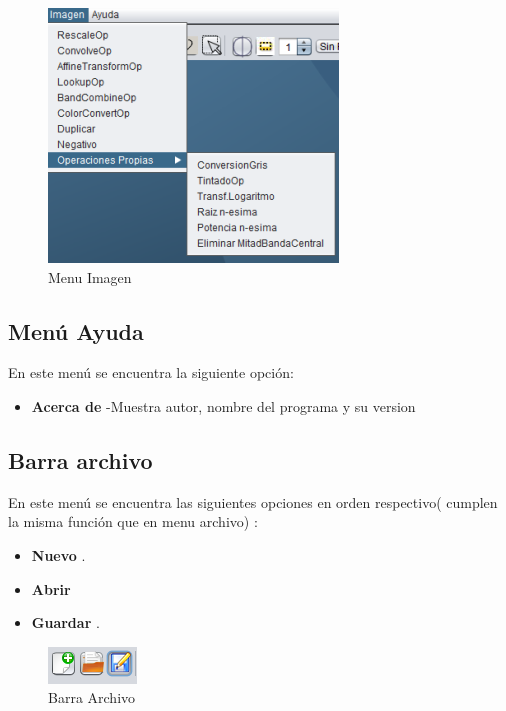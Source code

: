 \begin{figure}[H]
  \centering
    \includegraphics[scale=0.70]{images/menuimagenfinal}
  \caption{Menu Imagen}
  \label{Menu Imagen}
\end{figure}

\subsection{Menú Ayuda}
En este menú se encuentra la siguiente opción:

\begin{itemize}
\item \textbf{Acerca de} -Muestra autor, nombre del programa y su version
\end{itemize}

\subsection{Barra archivo}
En este menú se encuentra las siguientes opciones en orden respectivo( cumplen la misma función que en menu archivo) :
\begin{itemize}
\item \textbf{Nuevo} .
\item \textbf{Abrir} 
\item \textbf{Guardar} .

\end{itemize}
\begin{figure}[H]
  \centering
    \includegraphics[scale=0.80]{images/barraarchivo}
  \caption{Barra Archivo}
  \label{Barra Archivo}
\end{figure}


